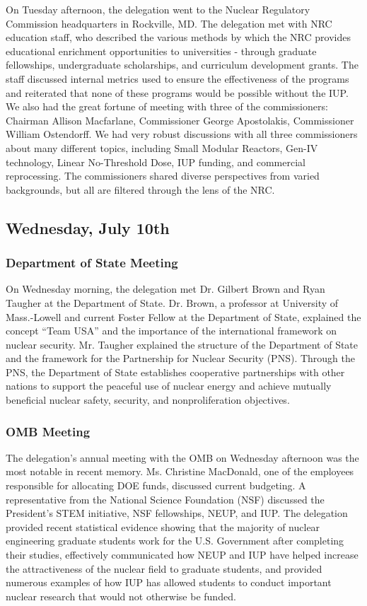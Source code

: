 On Tuesday afternoon, the delegation went to the Nuclear Regulatory Commission
headquarters in Rockville, MD. The delegation met with NRC education staff, who
described the various methods by which the NRC provides educational enrichment
opportunities to universities - through graduate fellowships, undergraduate
scholarships, and curriculum development grants. The staff discussed internal
metrics used to ensure the effectiveness of the programs and reiterated that
none of these programs would be possible without the IUP. We also had the great
fortune of meeting with three of the commissioners: Chairman Allison Macfarlane,
Commissioner George Apostolakis, Commissioner William Ostendorff. We had very
robust discussions with all three commissioners about many different topics,
including Small Modular Reactors, Gen-IV technology, Linear No-Threshold Dose,
IUP funding, and commercial reprocessing. The commissioners shared diverse
perspectives from varied backgrounds, but all are filtered through the lens of
the NRC.

\subsection*{Wednesday, July 10th}

\subsubsection*{Department of State Meeting}

On Wednesday morning, the delegation met Dr. Gilbert Brown and Ryan Taugher at
the Department of State. Dr. Brown, a professor at University of Mass.-Lowell
and current Foster Fellow at the Department of State, explained the concept
``Team USA'' and the importance of the international framework on nuclear
security. Mr. Taugher explained the structure of the Department of State and the
framework for the Partnership for Nuclear Security (PNS). Through the PNS, the
Department of State establishes cooperative partnerships with other nations to
support the peaceful use of nuclear energy and achieve mutually beneficial
nuclear safety, security, and nonproliferation objectives.
 
\subsubsection*{OMB Meeting}

The delegation's annual meeting with the OMB on Wednesday afternoon was the most
notable in recent memory. Ms. Christine MacDonald, one of the employees
responsible for allocating DOE funds, discussed current budgeting. A
representative from the National Science Foundation (NSF) discussed the
President's STEM initiative, NSF fellowships, NEUP, and IUP. The delegation
provided recent statistical evidence showing that the majority of nuclear
engineering graduate students work for the U.S. Government after completing
their studies, effectively communicated how NEUP and IUP have helped increase
the attractiveness of the nuclear field to graduate students, and provided
numerous examples of how IUP has allowed students to conduct important nuclear
research that would not otherwise be funded.
 
